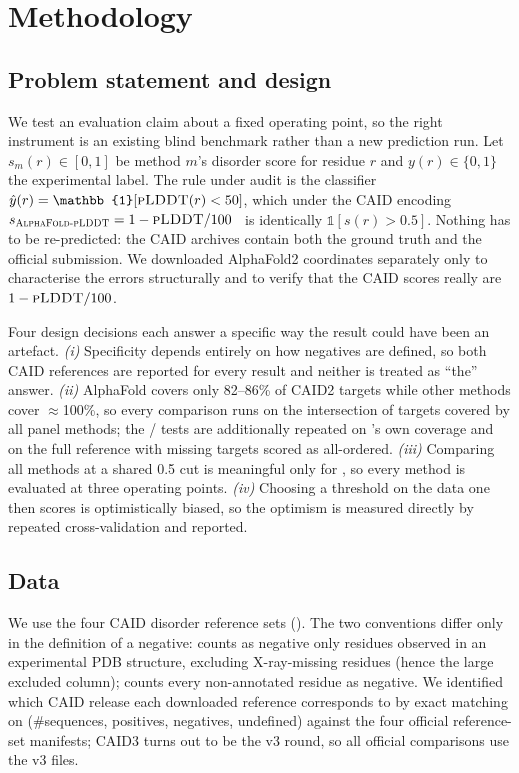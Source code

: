 \section{Methodology}
\label{sec:method}

\subsection{Problem statement and design}
\label{sec:setup}

We test an evaluation claim about a fixed operating point, so the right instrument is an
existing blind benchmark rather than a new prediction run. Let $s_m(r) \in [0,1]$ be method
$m$'s disorder score for residue $r$ and $y(r) \in \{0,1\}$ the experimental label. The rule
under audit is the classifier $\hat{y}(r) = \mathbb{1}[\plddt(r) < 50]$, which under the CAID
encoding $s_{\textsc{AlphaFold-pLDDT}} = 1 - \textsc{pLDDT}/100$~\citep{piovesan2022} is identically
$\mathbb{1}[s(r) > 0.5]$. Nothing has to be re-predicted: the CAID archives contain both the
ground truth and the official \afplddt submission. We downloaded AlphaFold2 coordinates
separately only to characterise the errors structurally and to verify that the CAID scores
really are $1 - \textsc{pLDDT}/100$.

Four design decisions each answer a specific way the result could have been an artefact.
\emph{(i)} Specificity depends entirely on how negatives are defined, so both CAID references
are reported for every result and neither is treated as ``the'' answer. \emph{(ii)} AlphaFold
covers only 82--86\% of CAID2 targets while other methods cover $\approx$100\%, so every
comparison runs on the intersection of targets covered by all panel methods; the \cone/\ctwo
tests are additionally repeated on \plddt's own coverage and on the full reference with missing
targets scored as all-ordered. \emph{(iii)} Comparing all methods at a shared 0.5 cut is
meaningful only for \plddt, so every method is evaluated at three operating points.
\emph{(iv)} Choosing a threshold on the data one then scores is optimistically biased, so the
optimism is measured directly by repeated cross-validation and reported.

\subsection{Data}

We use the four CAID disorder reference sets (). The two conventions differ
only in the definition of a negative: \dpdb counts as negative only residues observed in an
experimental PDB structure, excluding X-ray-missing residues (hence the large excluded column);
\dnox counts every non-annotated residue as negative. We identified which CAID release each
downloaded reference corresponds to by exact matching on (\#sequences, positives, negatives,
undefined) against the four official reference-set manifests; CAID3 turns out to be the v3
round, so all official comparisons use the v3 files.

